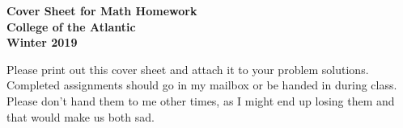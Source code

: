 \documentclass[11pt]{article}
\begin{document}
\pagestyle{empty}
 
\begin{center}
{\Large {\bf Cover Sheet for Math Homework}}\\
\smallskip
{\large {\bf College of the Atlantic}}\\
\smallskip
{ {\bf Winter 2019}}\\
\end{center}

\medskip
\noindent Please print out this cover sheet and attach it to your
problem solutions.  Completed assignments should go in my mailbox or
be handed in during class.  Please don't hand them to me other times,
as I might end up losing them and that would make us both sad. \\
\medskip

 \underline{\hspace{8.9cm}}\\[10pt]

 \underline{\hspace{6.5cm}}\\[10pt]

 \underline{\hspace{9.3cm}}\\[10pt]

\\[12pt]
\underline{\hspace{7.1cm}} \hspace{2cm}
\underline{\hspace{7.1cm}}\\[12pt]
\underline{\hspace{7.1cm}} \hspace{2cm}
\underline{\hspace{7.1cm}}\\[12pt]
\underline{\hspace{7.1cm}} \hspace{2cm}
\underline{\hspace{7.1cm}}\\[12pt]

\\[10pt]
\end{document}
